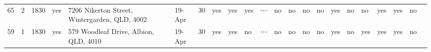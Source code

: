 \documentclass[11pt]{article}
\begin{document}
\begin{tabular}{r|lllllllllllllllllllll}
	 65                                                  & 2                                                   & 1830                                                & yes                                                 & 7206 Nikerton Street, Wintergarden, QLD, 4002       & 19-Apr                                              &   30                                                & yes                                                 & yes                                                 & yes                                                 & ⋯                                                   & no                                                  & no                                                  & no                                                  & no                                                  & yes                                                 & no                                                  & no                                                  & yes                                                 & yes                                                 & no                                                 \\
	 59                                                  & 1                                                   & 1830                                                & yes                                                 & 579 Woodleaf Drive, Albion, QLD, 4010               & 19-Apr                                              &   30                                                & yes                                                 & yes                                                 & no                                                  & ⋯                                                   & no                                                  & no                                                  & no                                                  & no                                                  & yes                                                 & no                                                  & yes                                                 & yes                                                 & yes                                                 & no                                                 \\

\end{tabular}
\end{document}
